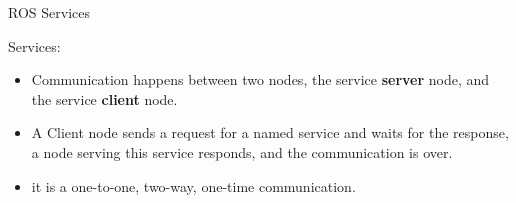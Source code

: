 \documentclass{beamer}
\begin{document}
\begin{frame}{ROS Services}

    {\huge Services:}
    \vspace{0.2cm}
    \begin{itemize}
        \item Communication happens between two nodes, the service \textbf{server} node, and the service \textbf{client} node.
        
        \item A Client node sends a request for a named service and waits for the response, a node serving this service responds, and the communication is over.
        
        \item it is a one-to-one, two-way, one-time communication.
    \end{itemize}  
\end{frame}
\end{document}
